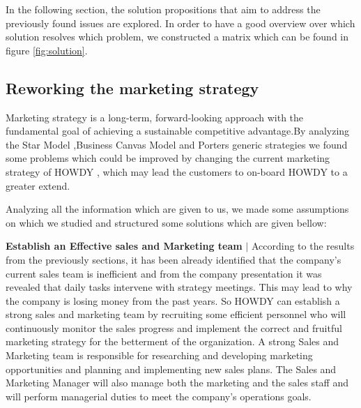 In the following section, the solution propositions that aim to address the previously found issues are explored. In order to have a good overview over which solution resolves which problem, we constructed a matrix which can be found in figure \ref{fig:solution}.

\subsection{Reworking the marketing strategy}

Marketing strategy is a long-term, forward-looking approach with the fundamental goal of achieving a sustainable competitive advantage.By analyzing the Star Model ,Business Canvas Model and Porters generic strategies we found some problems which could be improved by changing the current marketing strategy of HOWDY , which may lead the customers to on-board HOWDY to a greater extend.

\noindent Analyzing all the information which are given to us, we made some assumptions on which we studied and structured some solutions which are given bellow:

\noindent \textbf{Establish an Effective sales and Marketing team}  $|$ According to the results from the previously sections, it has been already identified that the company’s current sales team is inefficient and from the company presentation it was revealed that daily tasks intervene with strategy meetings. This may lead to why the company is losing money from the past years. So HOWDY can establish a strong sales and marketing team by recruiting some efficient personnel who will continuously monitor the sales progress and implement the correct and fruitful marketing strategy for the betterment of the organization. A strong Sales and Marketing team is responsible for researching and developing marketing opportunities and planning and implementing new sales plans. The Sales and Marketing Manager will also manage both the marketing and the sales staff and will perform managerial duties to meet the company's operations goals.

